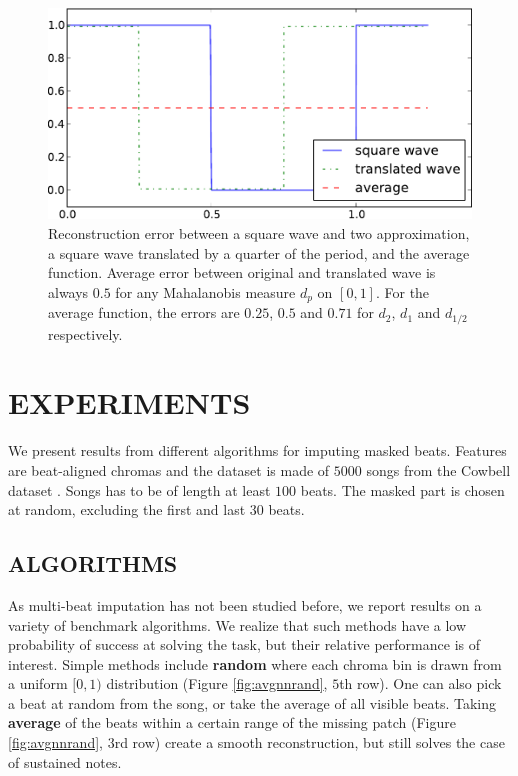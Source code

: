 \documentclass{article}
\begin{document}
\begin{figure}[t]
\begin{center}
\includegraphics[width=.8\columnwidth]{square}
\end{center}
\caption{Reconstruction error between a square wave and two approximation,
a square wave translated by a quarter of the period, and the average
function. Average error between original and translated wave is always $0.5$
for any Mahalanobis measure $d_p$ on $[0,1]$. 
For the average function, the errors are
$0.25$, $0.5$ and $0.71$ for $d_2$, $d_1$ and $d_{1/2}$ respectively.
\label{fig:square}}
\end{figure}

\section{EXPERIMENTS}
\label{sec:exp}
We present results from different algorithms for imputing masked
beats.  Features are beat-aligned chromas and the dataset is made of
$5000$ songs from the Cowbell dataset
\cite{Bertin-Mahieux2010a}. Songs has to be of length at least $100$
beats.  The masked part is chosen at random, excluding the first and
last $30$ beats.

\subsection{ALGORITHMS}
\label{ssec:algo}
As multi-beat imputation has not been studied before, we report
results on a variety of benchmark algorithms. We realize that such
methods have a low probability of success at solving the task, but
their relative performance is of interest.  Simple methods include
\textbf{random} where each chroma bin is drawn from a uniform $[0,1)$
distribution (Figure \ref{fig:avgnnrand}, $5$th row).  One can also
pick a beat at random from the song, or take the average of all
visible beats. Taking \textbf{average} of the beats within a certain
range of the missing patch (Figure \ref{fig:avgnnrand}, $3$rd row)
create a smooth reconstruction, but still solves the case of
sustained notes.
\end{document}
